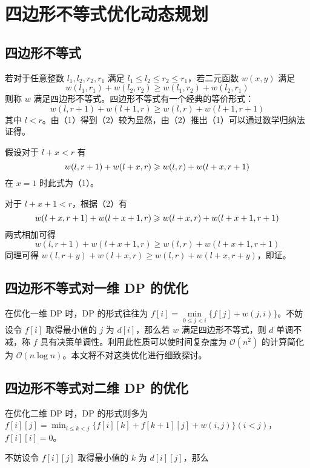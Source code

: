 
\chapter{四边形不等式优化动态规划}

\section{四边形不等式}

若对于任意整数 \(l_1,l_2,r_2,r_1\) 满足
\(l_1\le l_2\le r_2\le r_1\)，若二元函数 \(w(x,y)\) 满足 \[
w(l_1,r_1)+w(l_2,r_2)\ge w(l_1,r_2)+w(l_2,r_1)\tag{1}
\] 则称 \(w\) 满足四边形不等式。四边形不等式有一个经典的等价形式： \[
w(l,r+1)+w(l+1,r)\ge w(l,r)+w(l+1,r+1)\tag{2}
\] 其中
\(l < r\)。由（1）得到（2）较为显然，由（2）推出（1）可以通过数学归纳法证得。

假设对于 \(l+x < r\) 有 \[
w(l,r+1)+w(l+x,r)\ge w(l,r)+w(l+x,r+1)\\
\] 在 \(x=1\) 时此式为（1）。

对于 \(l+x+1 < r\)，根据（2）有 \[
w(l+x,r+1)+w(l+x+1,r)\ge w(l+x,r)+w(l+x+1,r+1)\\
\] 两式相加可得 \[
w(l,r+1)+w(l+x+1,r)\ge w(l,r)+w(l+x+1,r+1)
\] 同理可得 \(w(l,r+y)+w(l+x,r)\ge w(l,r)+w(l+x,r+y)\)，即证。

\section{四边形不等式对一维 DP 的优化}

在优化一维 DP 时，DP 的形式往往为
\(f[i]=\min\limits_{0\le j < i}\{f[j]+w(j,i)\}\)。不妨设令 \(f[i]\)
取得最小值的 \(j\) 为 \(d[i]\)，那么若 \(w\) 满足四边形不等式，则 \(d\)
单调不减，称 \(f\) 具有决策单调性。利用此性质可以使时间复杂度为
\(\mathcal{O}(n^2)\) 的计算简化为
\(\mathcal{O}(n\log n)\)。本文将不对这类优化进行细致探讨。

\section{四边形不等式对二维 DP 的优化}

在优化二维 DP 时，DP 的形式则多为
\(f[i][j]=\min_{i\le k < j}\{f[i][k]+f[k+1][j]+w(i,j)\}(i < j)\)，\(f[i][i]=0\)。

不妨设令 \(f[i][j]\) 取得最小值的 \(k\) 为 \(d[i][j]\)，那么


